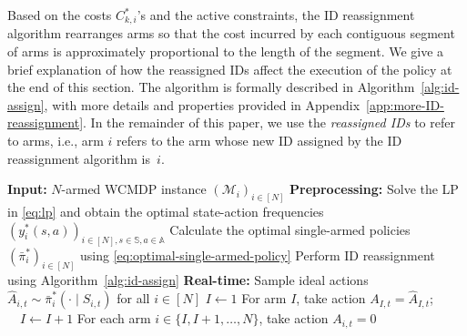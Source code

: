 \documentclass{article}
\theoremstyle{plain}
\theoremstyle{remark}
\newcommand{\sspa}{\mathbb{S}}
\newcommand{\aspa}{\mathbb{A}}
\newcommand{\pibar}{{\sysbar{\pi}}}
\newcommand{\sysbar}[1]{\bar{#1}}
\newcommand{\cM}{\mathcal{M}}
\begin{document}
Based on the costs $C_{k,i}^*$'s and the active constraints, the ID reassignment algorithm rearranges arms so that the cost incurred by each contiguous segment of arms is approximately proportional to the length of the segment.
We give a brief explanation of how the reassigned IDs affect the execution of the policy at the end of this section.
The algorithm is formally described in Algorithm~\ref{alg:id-assign}, with more details and properties provided in Appendix~\ref{app:more-ID-reassignment}.
In the remainder of this paper, we use the \emph{reassigned IDs} to refer to arms, i.e., arm $i$ refers to the arm whose new ID assigned by the ID reassignment algorithm is~$i$.



\begin{algorithm}[t]
    \caption{ID policy with reassignment}
    \label{alg:id policy}
    \begin{algorithmic}[1]
        \STATE
        \textbf{Input:} $N$-armed WCMDP instance $(\cM_i)_{i\in[N]}$
        \STATE \textbf{Preprocessing:}        
        \STATE \hspace{0.7em} Solve the LP in \eqref{eq:lp} and obtain the optimal state-action frequencies $(y^*_i(s,a))_{i\in [N], s\in\sspa,a\in\aspa}$
        \STATE \hspace{0.7em} Calculate the optimal single-armed policies $(\pibar_i^*)_{i\in[N]}$ using \eqref{eq:optimal-single-armed-policy} 
        \STATE \hspace{0.7em} Perform ID reassignment using Algorithm~\ref{alg:id-assign}
        \STATE \textbf{Real-time:}
            \STATE Sample ideal actions $\widehat{A}_{i,t}\sim \pibar_i^*(\cdot\mid S_{i,t})$ for all $i\in[N]$
            \STATE $I\gets 1$ 
                \STATE For arm $I$, take action $A_{I,t}=\widehat{A}_{I,t}$; $\quad I\gets I+1$
            \ENDWHILE
        \STATE For each arm $i\in\{I,I+1,\dots,N\}$, take action $A_{i,t}=0$
        \ENDFOR
    \end{algorithmic}
\end{algorithm}
\end{document}

